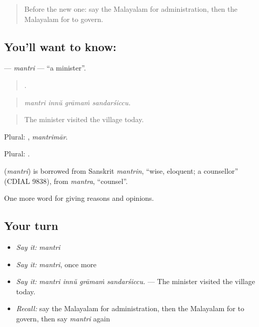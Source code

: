 \label{lesson:ML-C421-mantri}



\begin{quote}
Before the new one: say the Malayalam for administration, then the Malayalam for to govern.
\end{quote}

\subsection*{You'll want to know: }
\textbf{} — \emph{mantri} — \textquotedblleft{}a minister\textquotedblright{}.

\begin{quote}
   .
\end{quote}

\begin{quote}
\emph{mantri innŭ grāmaṁ sandarśiccu.}
\end{quote}

\begin{quote}
The minister visited the village today.
\end{quote}

Plural: , \emph{mantrimār}.

Plural: .

\begin{cousinweb}
\textbf{} (\emph{mantri}) is borrowed from Sanskrit \emph{mantrin}, \textquotedblleft{}wise, eloquent; a counsellor\textquotedblright{} (CDIAL 9838), from \emph{mantra}, \textquotedblleft{}counsel\textquotedblright{}.
\end{cousinweb}

\begin{grammarlens}[title={What you've built}]
One more word for giving reasons and opinions.
\end{grammarlens}

\subsection*{Your turn}
\begin{itemize}
\raggedright
  \item \emph{Say it:} \emph{mantri}
  \item \emph{Say it:} \emph{mantri}, once more
  \item \emph{Say it:} \emph{mantri innŭ grāmaṁ sandarśiccu.} — The minister visited the village today.
  \item \emph{Recall:} say the Malayalam for administration, then the Malayalam for to govern, then say \emph{mantri} again
\end{itemize}

